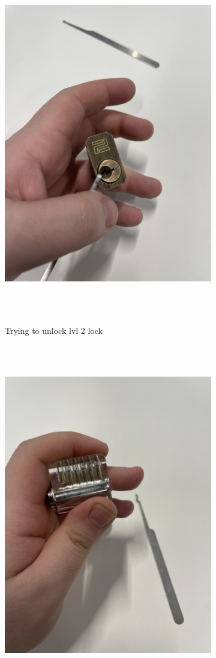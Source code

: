 \documentclass[12pt, letterpaper]{article}
\begin{document}
\begin{figure}[!ht]
    \centering
    \begin{subfigure}{.5\textwidth}
        \centering
        \includegraphics[width=.8\linewidth]{PDFs/Week 2/Lock pick lvl2.jpeg}
        \caption{Trying to unlock lvl 2 lock}
    \end{subfigure}%
    \begin{subfigure}{.5\textwidth}
        \centering
        \includegraphics[width=.8\linewidth]{PDFs/Week 2/Lock picking lvl5.jpeg}

\end{subfigure}
\end{figure}
\end{document}
